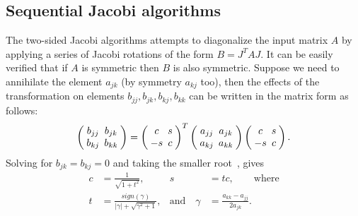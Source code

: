 \documentclass[10pt, conference, compsocconf]{IEEEtran}
\begin{document}
\subsection{Sequential Jacobi algorithms}
\label{sec:seqalgo}

The two-sided Jacobi algorithms attempts to diagonalize the input matrix $A$ by applying a series of Jacobi rotations of the form $B = J^T A J$. It can be easily verified that if $A$ is symmetric then $B$ is also symmetric. Suppose we need to annihilate the element $a_{jk}$ (by symmetry $a_{kj}$ too), then the effects of the transformation on elements $b_{jj}, b_{jk}, b_{kj}, b_{kk}$ can be written in the matrix form as follows:
\begin{align}
\setlength{\arraycolsep}{2.5pt}
  \left(\begin{array}{cc}
    b_{jj} & b_{jk} \\
    b_{kj} & b_{kk}
  \end{array} \right)
  =
  \left(\begin{array}{cc}
    c & s \\
    -s & c
  \end{array} \right)^T
  \left(\begin{array}{cc}
    a_{jj} & a_{jk} \\
    a_{kj} & a_{kk}
  \end{array} \right)
  \left(\begin{array}{cc}
    c & s \\
    -s & c
  \end{array} \right).
\end{align}
Solving for $b_{jk} = b_{kj} = 0$ and taking the smaller root~\cite{golub2012matrix}, gives 
\begin{align}
  c &= \frac{1}{\sqrt{1+t^2}}, & s&=tc, \qquad \text{where} \nonumber \\
  t &= \frac{sign(\gamma)}{|\gamma|+\sqrt{\gamma^2+1}}, & \text{and} \quad \gamma &= \frac{a_{kk} - a_{jj}}{2a_{jk}}.
\end{align}
\end{document}
